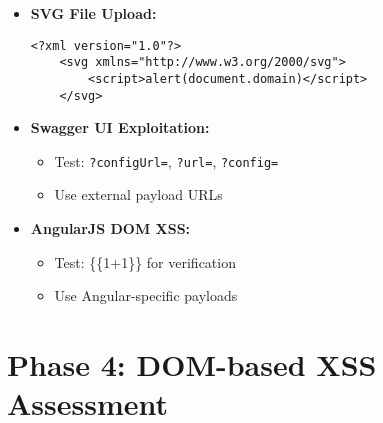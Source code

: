 \documentclass[12pt]{article}
\begin{document}
\begin{tcolorbox}[title={\textbf{3.2 Special Vector Attacks}}, colback=lightgreen]
\begin{itemize}[leftmargin=*]
    \item \textbf{SVG File Upload:}
    \begin{lstlisting}[basicstyle=\ttfamily\small]
    <?xml version="1.0"?>
    <svg xmlns="http://www.w3.org/2000/svg">
        <script>alert(document.domain)</script>
    </svg>
    \end{lstlisting}
    
    \item \textbf{Swagger UI Exploitation:}
    \begin{itemize}
        \item Test: \texttt{?configUrl=}, \texttt{?url=}, \texttt{?config=}
        \item Use external payload URLs
    \end{itemize}
    
    \item \textbf{AngularJS DOM XSS:}
    \begin{itemize}
        \item Test: \{\{1+1\}\} for verification
        \item Use Angular-specific payloads
    \end{itemize}
\end{itemize}
\end{tcolorbox}

\section{Phase 4: DOM-based XSS Assessment}
\end{document}
